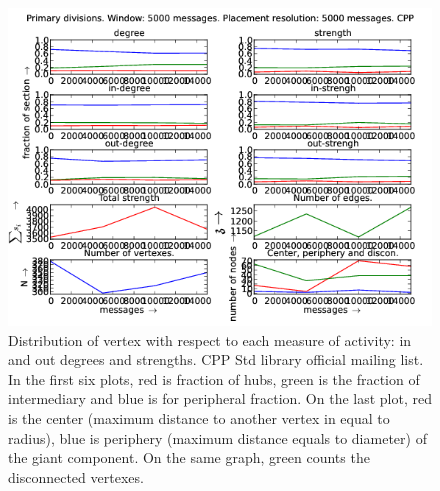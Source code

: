 \documentclass[%
 aip,
 jmp,%
 amsmath,amssymb,
 reprint,%
]{revtex4-1}
\begin{document}
\begin{figure}[hbtp] 
   \centering
        \includegraphics[width=\textwidth]{figs/CPP/5000}
    \caption{Distribution of vertex with respect to each measure of activity: in and out degrees and strengths. CPP Std library official mailing list. In the first six plots, red is fraction of hubs, green is the fraction of intermediary and blue is for peripheral fraction. On the last plot, red is the center (maximum distance to another vertex in equal to radius), blue is periphery (maximum distance equals to diameter) of the giant component. On the same graph, green counts the disconnected vertexes.}
    \label{fig:cpp5000}
\end{figure}
\end{document}
